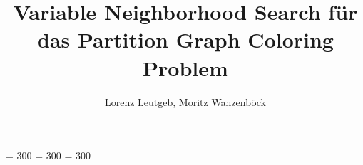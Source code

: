 \usepackage[utf8]{inputenc}
\usepackage[ngerman]{babel}
\usepackage[T1]{fontenc}
\usepackage[babel, german=quotes]{csquotes}
\usepackage[style=authoryear, natbib, backend=biber]{biblatex}
\usepackage[top=3cm,bottom=3cm,left=2cm,right=2cm]{geometry}
\usepackage{listings}
\usepackage{hyperref}
\usepackage{graphicx, fancyhdr, array, wrapfig, colortbl, algorithm, algpseudocode, subcaption, setspace}
\usepackage[usenames,dvipsnames]{xcolor}
\renewcommand{\listalgorithmname}{Algorithmenverzeichnis}
\renewcommand{\algorithmicend}{\textbf{Ende}}
\renewcommand{\algorithmicif}{\textbf{Falls}}
\renewcommand{\algorithmicthen}{\textbf{dann}}
\renewcommand{\algorithmicelse}{\textbf{Sonst}}
\renewcommand{\algorithmicdo}{\textbf{}}
\renewcommand{\algorithmicwhile}{\textbf{Solange}}
\renewcommand{\algorithmicreturn}{\textbf{Returniere}}
\renewcommand{\algorithmicrequire}{\textbf{Eingabe}}
\renewcommand{\algorithmicensure}{\textbf{Ausgabe}}
\renewcommand{\algorithmicforall}{\textbf{Für alle}}
\renewcommand{\algorithmicfor}{\textbf{Für}}

\lstset{style=customc}
\linespread{1.5}
\setlength{\parindent}{4mm}
\setlength{\parskip}{2mm}
\pagestyle{fancy}
\fancyhf{}
\clubpenalty = 300
\widowpenalty = 300
\displaywidowpenalty = 300
\fancyfoot{}
\fancyhead{}
\renewcommand{\footrulewidth}{0.4pt}
\rfoot{{\footnotesize \textnormal{\thepage}}}
\lhead{{\footnotesize \textnormal{\thesection}}}
\lfoot{{\footnotesize \textnormal{\the\year}}}

\let\origappendix\appendix
\renewcommand\appendix{\clearpage\pagenumbering{roman}\origappendix}
\renewcommand{\lstlistlistingname}{Codeverzeichnis}

\title{Variable Neighborhood Search für das Partition Graph Coloring Problem}
\author{Lorenz Leutgeb, Moritz Wanzenböck}
